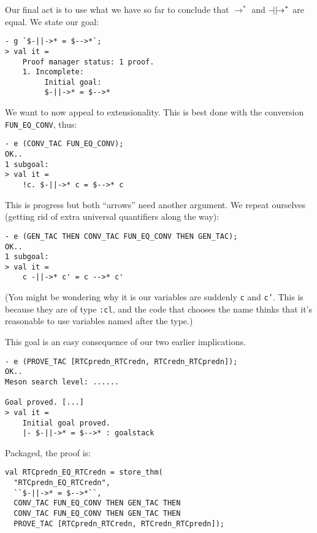 Our final act is to use what we have so far to conclude that
$\rightarrow^*$ and $\mathbin{-\!\!\!\mid\mid\!\rightarrow}^*$ are equal.  We state our goal:
\begin{session}
\begin{verbatim}
- g `$-||->* = $-->*`;
> val it =
    Proof manager status: 1 proof.
    1. Incomplete:
         Initial goal:
         $-||->* = $-->*
\end{verbatim}
\end{session}
We want to now appeal to extensionality.  This is best done with the
conversion \texttt{FUN\_EQ\_CONV}, thus:
\begin{session}
\begin{verbatim}
- e (CONV_TAC FUN_EQ_CONV);
OK..
1 subgoal:
> val it =
    !c. $-||->* c = $-->* c
\end{verbatim}
\end{session}
This is progress but both ``arrows'' need another argument.  We repeat
ourselves (getting rid of extra universal quantifiers along the way):
\begin{session}
\begin{verbatim}
- e (GEN_TAC THEN CONV_TAC FUN_EQ_CONV THEN GEN_TAC);
OK..
1 subgoal:
> val it =
    c -||->* c' = c -->* c'
\end{verbatim}
\end{session}
(You might be wondering why it is our variables are suddenly
\texttt{c} and \texttt{c'}.  This is because they are of type
\texttt{:cl}, and the code that chooses the name thinks that it's
reasonable to use variables named after the type.)

This goal is an easy consequence of our two earlier implications.
\begin{session}
\begin{verbatim}
- e (PROVE_TAC [RTCpredn_RTCredn, RTCredn_RTCpredn]);
OK..
Meson search level: ......

Goal proved. [...]
> val it =
    Initial goal proved.
    |- $-||->* = $-->* : goalstack
\end{verbatim}
\end{session}
Packaged, the proof is:
\begin{session}
\begin{verbatim}
val RTCpredn_EQ_RTCredn = store_thm(
  "RTCpredn_EQ_RTCredn",
  ``$-||->* = $-->*``,
  CONV_TAC FUN_EQ_CONV THEN GEN_TAC THEN
  CONV_TAC FUN_EQ_CONV THEN GEN_TAC THEN
  PROVE_TAC [RTCpredn_RTCredn, RTCredn_RTCpredn]);
\end{verbatim}
\end{session}


